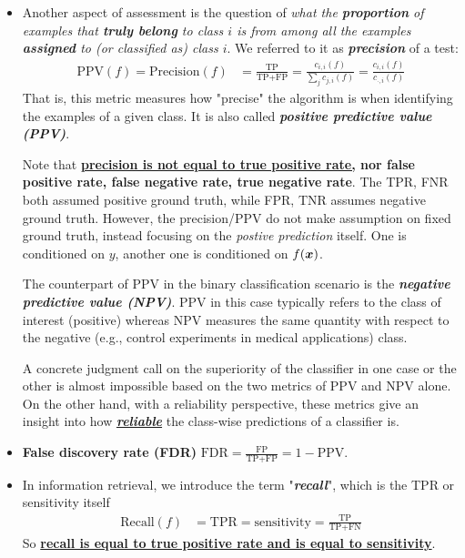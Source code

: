 \documentclass[11pt]{article}
\begin{document}
\begin{itemize}
\item Another aspect of assessment is the question of \emph{what the \textbf{proportion} of examples that \textbf{truly belong} to class $i$ is from among all the examples \textbf{assigned} to (or classified as) class $i$}.  We referred to it as \emph{\textbf{precision}} of a test:
\begin{align}
\text{PPV}(f)  = \text{Precision}(f) &= \frac{\text{TP}}{\text{TP} + \text{FP}} = \frac{c_{i,i}(f)}{\sum_{j}c_{j,i}(f)} =  \frac{c_{i,i}(f)}{c_{\cdot,i}(f)}  \label{eqn: precision}
\end{align} That is, this metric measures how "precise" the algorithm is when identifying the examples of a given class. It is also called \emph{\textbf{positive predictive value (PPV)}}.

Note that \textbf{\underline{precision is not equal to true positive rate,} nor false positive rate, false negative rate, true negative rate}. The TPR, FNR both assumed positive ground truth, while FPR, TNR assumes negative ground truth. However, the precision/PPV do not make assumption on fixed ground truth, instead focusing on the \emph{postive prediction} itself. One is conditioned on $y$, another one is conditioned on $f(\boldsymbol{x})$.

The counterpart of PPV in the binary classification scenario is the \emph{\textbf{negative predictive value (NPV)}}. PPV in this case typically refers to the class of interest (positive) whereas NPV measures the same quantity with respect to the negative (e.g., control experiments in medical applications) class.

A concrete judgment call on the superiority of the classifier in one case or the other is almost impossible based on the two metrics of PPV and NPV alone.   On the other
hand, with a reliability perspective, these metrics give an insight into how \underline{\textbf{\emph{reliable}}} the class-wise predictions of a classifier is.

\item \textbf{False discovery rate (FDR)} $\text{FDR} = \frac{\text{FP}}{\text{TP} + \text{FP}} = 1 - \text{PPV}$.

\item In information retrieval, we introduce the term "\emph{\textbf{recall}}", which is the TPR or sensitivity itself
\begin{align}
\text{Recall}(f) &= \text{TPR} = \text{sensitivity} =  \frac{\text{TP}}{\text{TP}+ \text{FN}}  \label{eqn: recall}
\end{align} So \underline{\textbf{recall is equal to true positive rate and is equal to sensitivity}}.


\end{itemize}
\end{document}
